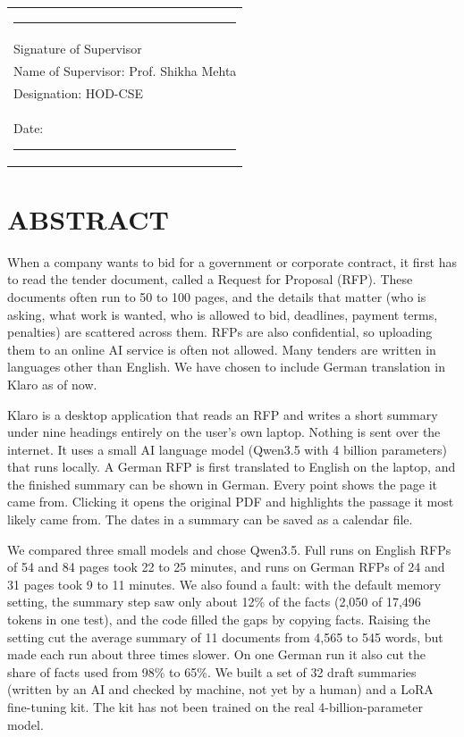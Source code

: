 \documentclass[11pt,a4paper,oneside]{report}
\newcommand{\supervisor}{Prof. Shikha Mehta}
\newcommand{\supervisordesig}{HOD-CSE}
\newcommand{\tocline}[3]{\par\noindent{#1#2}\cftdotfill{\cftdotsep}{#1#3}\par\vspace{2pt}}
\newcommand{\addtocline}[2]{\addtocontents{toc}{\protect\tocline{#1}{#2}{\thepage}}}
\begin{document}
\vspace{3cm}
\noindent
\begin{tabular}{@{}l@{}}
\rule{6cm}{0.4pt}\\
Signature of Supervisor\\[8pt]
Name of Supervisor: \supervisor\\
Designation: \supervisordesig\\
Date: \rule{3.5cm}{0.4pt}\\
\end{tabular}

\chapter*{ABSTRACT}
\addtocline{\itshape}{Abstract}
When a company wants to bid for a government or corporate contract, it first has to read the tender
document, called a Request for Proposal (RFP). These documents often run to 50 to 100 pages, and the
details that matter (who is asking, what work is wanted, who is allowed to bid, deadlines, payment
terms, penalties) are scattered across them. RFPs are also confidential, so uploading them to an
online AI service is often not allowed. Many tenders are written in languages other than English. We have chosen to include German translation in Klaro as of now.

Klaro is a desktop application that reads an RFP and writes a short summary under nine headings
entirely on the user's own laptop. Nothing is sent over the internet. It uses a small AI language
model (Qwen3.5 with 4 billion parameters) that runs locally. A German RFP is first translated to
English on the laptop, and the finished summary can be shown in German. Every point shows the page it
came from. Clicking it opens the original PDF and highlights the passage it most likely came from.
The dates in a summary can be saved as a calendar file.

We compared three small models and chose Qwen3.5. Full runs on English RFPs of 54 and 84 pages took
22 to 25 minutes, and runs on German RFPs of 24 and 31 pages took 9 to 11 minutes. We also found a
fault: with the default memory setting, the summary step saw only about 12\% of the facts (2,050 of
17,496 tokens in one test), and the code filled the gaps by copying facts. Raising the setting cut the
average summary of 11 documents from 4,565 to 545 words, but made each run about three times
slower. On one German run it also cut the share of facts used from 98\% to 65\%. We built a set of 32 draft summaries (written by an AI and checked by machine, not yet by
a human) and a LoRA fine-tuning kit. The kit has not been trained on the real 4-billion-parameter model.
\end{document}
